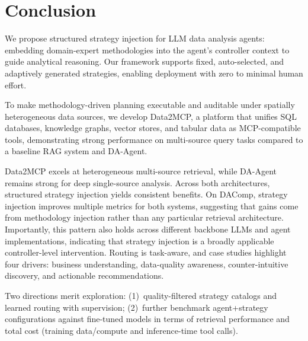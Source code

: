 \section{Conclusion}

We propose structured strategy injection for LLM data analysis agents: embedding domain-expert methodologies into the agent's controller context to guide analytical reasoning. Our framework supports fixed, auto-selected, and adaptively generated strategies, enabling deployment with zero to minimal human effort.

To make methodology-driven planning executable and auditable under spatially heterogeneous data sources, we develop Data2MCP, a platform that unifies SQL databases, knowledge graphs, vector stores, and tabular data as MCP-compatible tools, demonstrating strong performance on multi-source query tasks compared to a baseline RAG system and DA-Agent.

Data2MCP excels at heterogeneous multi-source retrieval, while DA-Agent remains strong for deep single-source analysis. Across both architectures, structured strategy injection yields consistent benefits. On DAComp, strategy injection improves multiple metrics for both systems, suggesting that gains come from methodology injection rather than any particular retrieval architecture. Importantly, this pattern also holds across different backbone LLMs and agent implementations, indicating that strategy injection is a broadly applicable controller-level intervention. Routing is task-aware, and case studies highlight four drivers: business understanding, data-quality awareness, counter-intuitive discovery, and actionable recommendations.

Two directions merit exploration:
(1)~quality-filtered strategy catalogs and learned routing with supervision;
(2)~further benchmark agent+strategy configurations against fine-tuned models in terms of retrieval performance and total cost (training data/compute and inference-time tool calls). 

